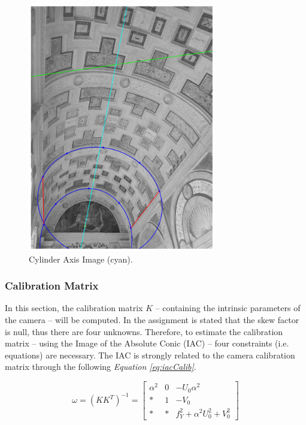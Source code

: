 \documentclass[12pt,a4paper]{article}
\begin{document}
\begin{figure}[H]
    \centering
    \includegraphics[width=0.73\textwidth]{Images/PalazzoTe_axis.png}
    \caption[Cylinder Axis Image.]{Cylinder Axis Image (cyan).}
    \label{fig:axisImage}
\end{figure}

\subsubsection{Calibration Matrix}\label{sec:toCalibrationMatrix}
In this section, the calibration matrix $K$ -- containing the intrinsic parameters of the camera --  will be computed. In the assignment is stated that the skew factor is null, thus there are four unknowns. Therefore, to estimate the calibration matrix -- using the Image of the Absolute Conic (IAC) -- four constraints (i.e. equations) are necessary. The IAC is strongly related to the camera calibration matrix through the following \textit{Equation \ref{eq:iacCalib}}.

\begin{equation}
    \omega = (KK^T)^{-1} = 
    \begin{bmatrix}
    \alpha^2 & 0 & -U_0\alpha^2\\
    * & 1 & -V_0\\
    * & * & f_Y^2+\alpha^2U_0^2+V_0^2
    \end{bmatrix}
    \label{eq:iacCalib}
\end{equation}
\bigskip
\end{document}
